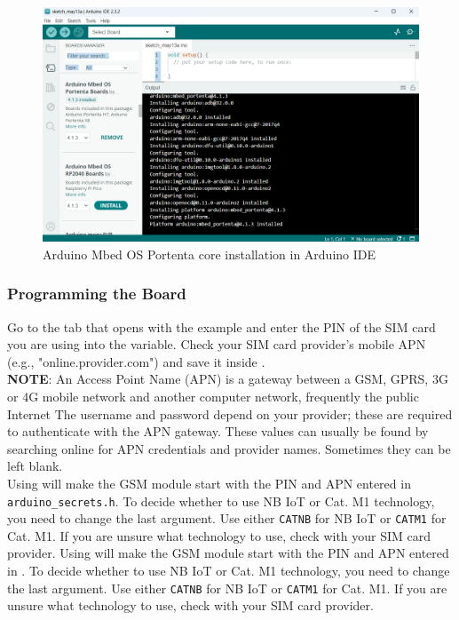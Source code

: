 \begin{figure}
	\begin{center}
		\includegraphics[width=0.7\linewidth]{Images/PotentaIoTGNSSShield/CoreInstallation.png}
		\caption{Arduino Mbed OS Portenta core installation in Arduino IDE}
		\label{CoreInstallation}
	\end{center}
\end{figure}

\subsubsection{Programming the Board}
Go to the  tab that opens with the example and enter the PIN of the SIM card you are using into the  variable. Check your SIM card provider's mobile APN (e.g., "online.provider.com") and save it inside .
\\
\textbf{NOTE}:
An Access Point Name (APN) is a gateway between a GSM, GPRS, 3G or 4G mobile network and another computer network, frequently the public Internet
The username and password depend on your provider; these are required to authenticate with the APN gateway. These values can usually be found by searching online for APN credentials and provider names. Sometimes they can be left blank.
\\
Using  will make the GSM module start with the PIN and APN entered in \verb|arduino_secrets.h|. To decide whether to use NB IoT or Cat. M1 technology, you need to change the last argument. Use either \verb|CATNB| for NB IoT or \verb|CATM1| for Cat. M1. If you are unsure what technology to use, check with your SIM card provider.
Using  will make the GSM module start with the PIN and APN entered in . To decide whether to use NB IoT or Cat. M1 technology, you need to change the last argument. Use either \verb|CATNB| for NB IoT or \verb|CATM1| for Cat. M1. If you are unsure what technology to use, check with your SIM card provider.


